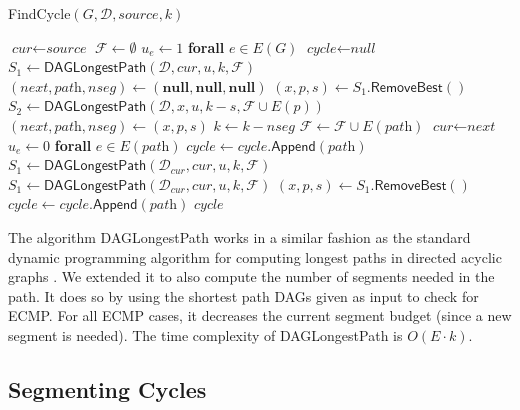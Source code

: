 \begin{algorithm}[htbp]
\small
\caption{\textsf{FindCycle}$\left( G, \mathcal{D}, \textit{source}, k \right)$}
\begin{algorithmic}[1]
\STATE $\textit{cur} \gets \textit{source}$
\STATE $\mathcal{F} \gets \emptyset$
\STATE $u_e \gets 1$ \textbf{forall} $e \in E(G)$
\STATE $\textit{cycle} \gets \textit{null}$
\STATE $S_1 \gets \textsf{DAGLongestPath}(\mathcal{D}, \textit{cur}, u, k, \mathcal{F})$
  \STATE $(\textit{next}, \textit{path}, \textit{nseg}) \gets (\textbf{null}, \textbf{null}, \textbf{null})$
    \STATE $(x, p, s) \gets S_1.\textsf{RemoveBest}()$
    \STATE $S_2 \gets \textsf{DAGLongestPath}(\mathcal{D}, \textit{x}, u, k - s, \mathcal{F} \cup E(p))$
      \STATE $(\textit{next}, \textit{path}, \textit{nseg}) \gets (x, p, s)$
    \ENDIF
  \ENDWHILE
    \STATE $k \gets k - \textit{nseg}$
    \STATE $\mathcal{F} \gets \mathcal{F} \cup E(\textit{path})$
    \STATE $\textit{cur} \gets \textit{next}$
    \STATE $u_e \gets 0$ \textbf{forall} $e \in E(\textit{path})$
    \STATE $\textit{cycle} \gets \textit{cycle}.\textsf{Append}(\textit{path})$
    \STATE $S_1 \gets \textsf{DAGLongestPath}(\mathcal{D}_{\textit{cur}}, \textit{cur}, u, k, \mathcal{F})$
  \ENDIF
\ENDWHILE
{}
  \STATE $S_1 \gets \textsf{DAGLongestPath}(\mathcal{D}_{\textit{cur}}, \textit{cur}, u, k, \mathcal{F})$
  \STATE $(x, p, s) \gets S_1.\textsf{RemoveBest}()$
  \STATE $\textit{cycle} \gets \textit{cycle}.\textsf{Append}(\textit{path})$
\ENDIF
\RETURN $\textit{cycle}$
\end{algorithmic}
\label{algo:findCycle}
\end{algorithm}

The algorithm \textsf{DAGLongestPath} works in a similar fashion as the standard
dynamic programming algorithm for computing longest paths in directed acyclic
graphs \cite{sedgewick2011algorithms}. We extended it to also compute the number
of segments needed in the path. It does so by using the shortest path DAGs given
as input to check for ECMP. For all ECMP cases, it decreases the current segment
budget (since a new segment is needed). The time complexity of
\textsf{DAGLongestPath} is $O(E \cdot k)$.

\subsection{Segmenting Cycles}

